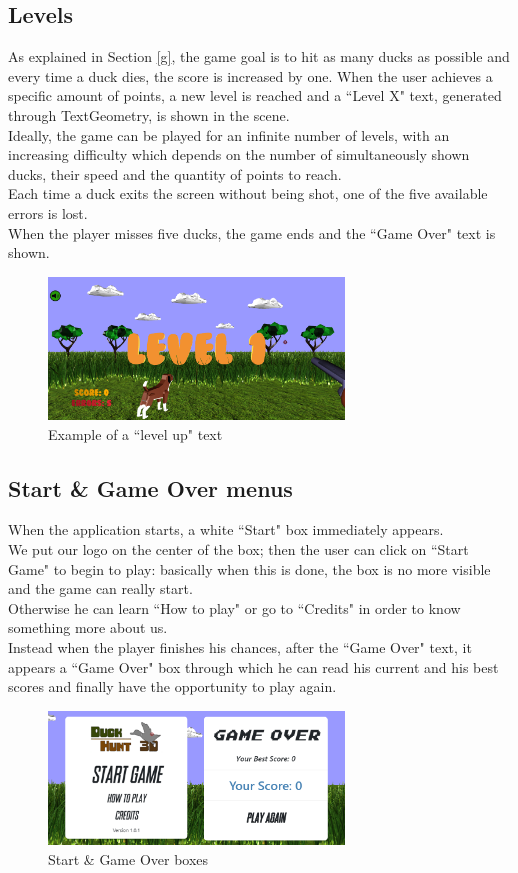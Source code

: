 \documentclass[12pt,a4paper]{article}
\begin{document}
	\subsection{Levels}
	As explained in Section \ref{g}, the game goal is to hit as many ducks as possible and every time a duck dies, the score is increased by one. When the user achieves a specific amount of points, a new level is reached and a ``Level X" text, generated through TextGeometry, is shown in the scene.\\
	Ideally, the game can be played for an infinite number of levels, with an increasing difficulty which depends on the number of simultaneously shown ducks, their speed and the quantity of points to reach.\\
	Each time a duck exits the screen without being shot, one of the five available errors is lost.\\ When the player misses five ducks, the game ends and the ``Game Over" text is shown.
	\begin{figure}[hbt!]
		\centering
		\includegraphics[width=0.7\textwidth]{levels}
		\caption{Example of a ``level up" text}
		\label{fig4}
	\end{figure}

	\subsection{Start \& Game Over menus}
	When the application starts, a white ``Start" box immediately appears.\\
	We put our logo on the center of the box; then the user can click on ``Start Game" to begin to play: basically when this is done, the box is no more visible and the game can really start. \\
	Otherwise he can learn ``How to play" or go to ``Credits" in order to know something more about us.\\
	Instead when the player finishes his chances, after the ``Game Over" text, it appears a ``Game Over" box through which he can read his current and his best scores and finally have the opportunity to play again.
	\begin{figure}[hbt!]
		\centering
		\includegraphics[width=0.7\textwidth]{boxes}
		\caption{Start \& Game Over boxes}
		\label{fig5}
	\end{figure}
	
\end{document}
